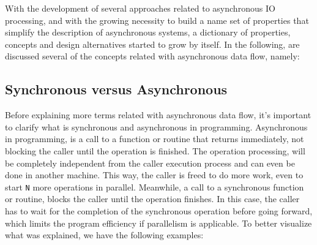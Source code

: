 \vspace{-10pt}
With the development of several approaches related to asynchronous IO processing, and with the growing necessity to build a name set of properties that simplify the description of asynchronous systems, a dictionary
of properties, concepts and design alternatives started to grow by itself. In the following, are discussed several of the concepts related with asynchronous data flow, namely:
\vspace{-10pt}
\subsection{Synchronous versus Asynchronous}
Before explaining more terms related with asynchronous data flow, it's important to clarify what is synchronous and asynchronous in programming. 
Asynchronous in programming, is a call to a function or routine that returns immediately, not blocking the caller until the operation is finished. The operation processing, will be completely independent from the caller execution process and can even be done in another machine. This way, the caller is freed to do more work, even to start \texttt{N} more operations in parallel. 
Meanwhile, a call to a synchronous function or routine, blocks the caller until the operation finishes. In this case, the caller has to wait for the completion of the synchronous operation before going forward, which limits the program efficiency if parallelism is applicable.
To better visualize what was explained, we have the following examples: 
